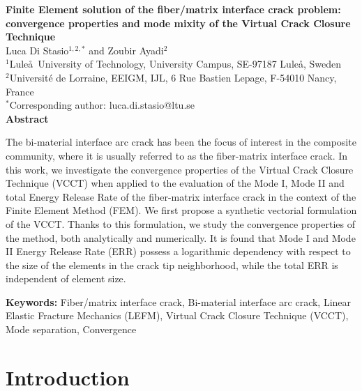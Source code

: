 
\thispagestyle{plain}
\begin{center}
\Large\textbf{Finite Element solution of the fiber/matrix interface crack problem: convergence properties and mode mixity of the Virtual Crack Closure Technique}\\
\vspace{10mm}
\normalsize Luca Di Stasio$^{1,2,*}$ and Zoubir Ayadi$^{2}$\\
\vspace{5mm}
\normalsize $^{1}$Lule\aa\ University of Technology, University Campus, SE-97187 Lule\aa, Sweden\\
\normalsize $^{2}$Universit\'e de Lorraine, EEIGM, IJL, 6 Rue Bastien Lepage, F-54010 Nancy, France\\
\vspace{5mm}
\normalsize $^{*}$Corresponding author: luca.di.stasio@ltu.se\\
\vspace{15mm}
\textbf{Abstract}\\
\end{center}

The bi-material interface arc crack has been the focus of interest in the composite community, where it is usually referred to as the fiber-matrix interface crack. In this work, we investigate the convergence properties of the Virtual Crack Closure Technique (VCCT) when applied to the evaluation of the Mode I, Mode II and total Energy Release Rate of the fiber-matrix interface crack in the context of the Finite Element Method (FEM). We first propose a synthetic vectorial formulation of the VCCT. Thanks to this formulation, we study the convergence properties of the method, both analytically and numerically. It is found that Mode I and Mode II Energy Release Rate (ERR) possess a logarithmic dependency with respect to the size of the elements in the crack tip neighborhood, while the total ERR is independent of element size.

\vspace{5mm}

\textbf{Keywords:} Fiber/matrix interface crack, Bi-material interface arc crack, Linear Elastic Fracture Mechanics (LEFM), Virtual Crack Closure Technique (VCCT), Mode separation, Convergence

\section{Introduction}\label{paperA:sec:intro}

